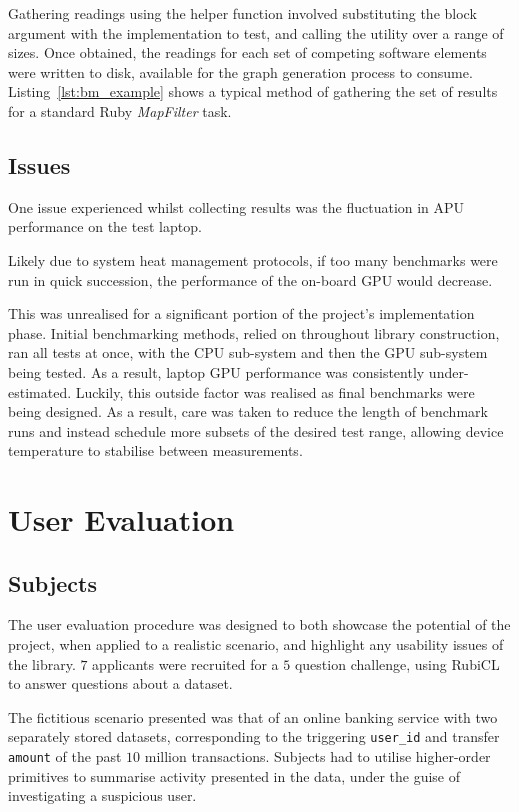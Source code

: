 Gathering readings using the helper function involved substituting the block argument with the implementation to test, and calling the utility over a range of sizes.
Once obtained, the readings for each set of competing software elements were written to disk, available for the graph generation process to consume.
Listing~\ref{lst:bm_example} shows a typical method of gathering the set of results for a standard Ruby \emph{MapFilter} task.


\subsection{Issues}
One issue experienced whilst collecting results was the fluctuation in \ac{APU} performance on the test laptop.

Likely due to system heat management protocols, if too many benchmarks were run in quick succession, the performance of the on-board \ac{GPU} would decrease.

This was unrealised for a significant portion of the project's implementation phase. Initial benchmarking methods, relied on throughout library construction, ran all tests at once, with the \ac{CPU} sub-system and then the \ac{GPU} sub-system being tested. As a result, laptop \ac{GPU} performance was consistently under-estimated. Luckily, this outside factor was realised as final benchmarks were being designed. As a result, care was taken to reduce the length of benchmark runs and instead schedule more subsets of the desired test range, allowing device temperature to stabilise between measurements.

\section{User Evaluation}
\subsection{Subjects}
The user evaluation procedure was designed to both showcase the potential of the project, when applied to a realistic scenario, and highlight any usability issues of the library.
$7$ applicants were recruited for a $5$ question challenge, using RubiCL to answer questions about a dataset.

The fictitious scenario presented was that of an online banking service with two separately stored datasets, corresponding to the triggering \verb|user_id| and transfer \verb|amount| of the past $10$ million transactions. Subjects had to utilise higher-order primitives to summarise activity presented in the data, under the guise of investigating a suspicious user.

